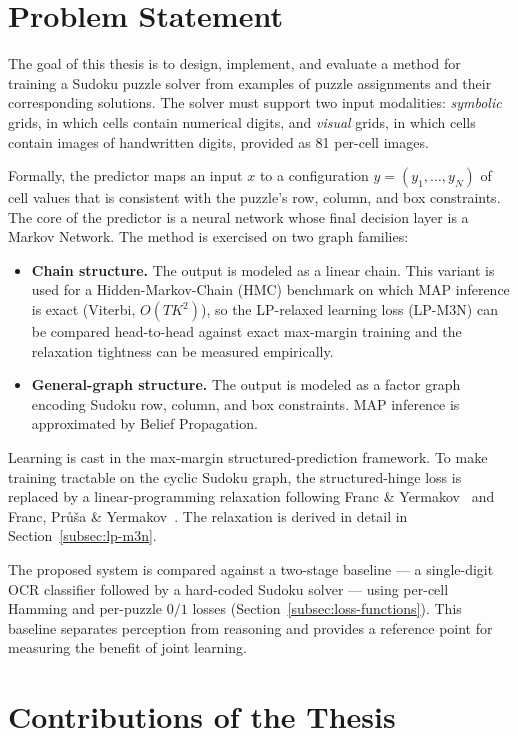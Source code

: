 \section{Problem Statement}

The goal of this thesis is to design, implement, and evaluate a method
for training a Sudoku puzzle solver from examples of puzzle assignments
and their corresponding solutions. The solver must support two input
modalities: \emph{symbolic} grids, in which cells contain numerical
digits, and \emph{visual} grids, in which cells contain images of
handwritten digits, provided as 81 per-cell images.

Formally, the predictor maps an input $x$ to a configuration
$y = (y_1, \ldots, y_N)$ of cell values that is consistent with the
puzzle's row, column, and box constraints. The core of the predictor
is a neural network whose final decision layer is a Markov Network.
The method is exercised on two graph families:
\begin{itemize}
    \item \textbf{Chain structure.} The output is modeled as a linear
    chain. This variant is used for a Hidden-Markov-Chain (HMC)
    benchmark on which MAP inference is exact (Viterbi,
    $O(T K^{2})$), so the LP-relaxed learning loss (LP-M3N) can be
    compared head-to-head against exact max-margin training and the
    relaxation tightness can be measured empirically.
    \item \textbf{General-graph structure.} The output is modeled as a
    factor graph encoding Sudoku row, column, and box constraints. MAP
    inference is approximated by Belief Propagation.
\end{itemize}

Learning is cast in the max-margin structured-prediction framework. To
make training tractable on the cyclic Sudoku graph, the
structured-hinge loss is replaced by a linear-programming relaxation
following Franc \& Yermakov~\cite{franc2021} and
Franc, Pr\r{u}\v{s}a \& Yermakov~\cite{franc2022}. The relaxation is
derived in detail in Section~\ref{subsec:lp-m3n}.

The proposed system is compared against a two-stage baseline --- a
single-digit OCR classifier followed by a hard-coded Sudoku solver ---
using per-cell Hamming and per-puzzle $0/1$ losses
(Section~\ref{subsec:loss-functions}). This baseline separates
perception from reasoning and provides a reference point for measuring
the benefit of joint learning.

\section{Contributions of the Thesis}

